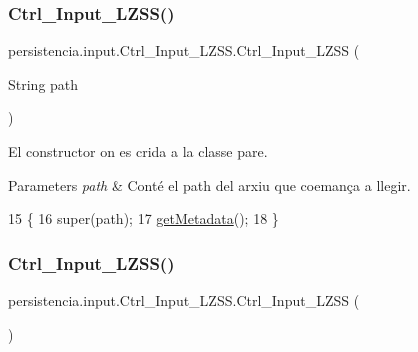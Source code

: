 \subsubsection{\texorpdfstring{Ctrl\+\_\+\+Input\+\_\+\+L\+Z\+S\+S()}{Ctrl\_Input\_LZSS()}\hspace{0.1cm}{\footnotesize\ttfamily [1/2]}}
{\footnotesize\ttfamily persistencia.\+input.\+Ctrl\+\_\+\+Input\+\_\+\+L\+Z\+S\+S.\+Ctrl\+\_\+\+Input\+\_\+\+L\+Z\+SS (\begin{DoxyParamCaption}\item[{String}]{path }\end{DoxyParamCaption})\hspace{0.3cm}{\ttfamily [inline]}}



El constructor on es crida a la classe pare. 


\begin{DoxyParams}{Parameters}
{\em path} & Conté el path del arxiu que coemança a llegir. \\
\hline
\end{DoxyParams}

\begin{DoxyCode}
15                                         \{
16         super(path);
17         \hyperlink{classpersistencia_1_1input_1_1Ctrl__Input_a46e05fce164a6803820c02565c1769c8}{getMetadata}();
18     \}
\end{DoxyCode}
\mbox{\label{classpersistencia_1_1input_1_1Ctrl__Input__LZSS_a5f83902014e0f60a116380a6e8724960}} 
\subsubsection{\texorpdfstring{Ctrl\+\_\+\+Input\+\_\+\+L\+Z\+S\+S()}{Ctrl\_Input\_LZSS()}\hspace{0.1cm}{\footnotesize\ttfamily [2/2]}}
{\footnotesize\ttfamily persistencia.\+input.\+Ctrl\+\_\+\+Input\+\_\+\+L\+Z\+S\+S.\+Ctrl\+\_\+\+Input\+\_\+\+L\+Z\+SS (\begin{DoxyParamCaption}{ }\end{DoxyParamCaption})\hspace{0.3cm}{\ttfamily [inline]}}




